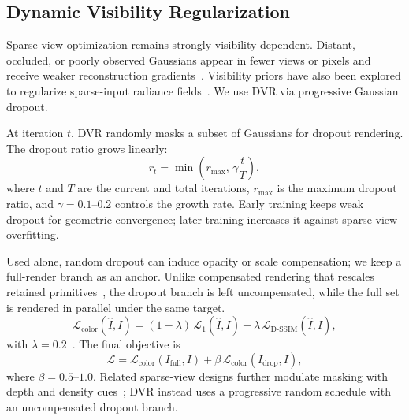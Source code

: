 \subsection{Dynamic Visibility Regularization}
\label{sec:dvr}

Sparse-view optimization remains strongly visibility-dependent. Distant, occluded, or poorly observed Gaussians appear in fewer views or pixels and receive weaker reconstruction gradients~\cite{Xu25_DropoutGS,Park25_DropGaussian}. Visibility priors have also been explored to regularize sparse-input radiance fields~\cite{Somraj23_ViPNeRF}. We use DVR via progressive Gaussian dropout.

At iteration $t$, DVR randomly masks a subset of Gaussians for dropout rendering. The dropout ratio grows linearly:
\begin{equation}
\label{eq:dropout_ratio}
r_t=\min\left(r_{\max},\,\gamma\frac{t}{T}\right),
\end{equation}
where $t$ and $T$ are the current and total iterations, $r_{\max}$ is the maximum dropout ratio, and $\gamma=0.1$--$0.2$ controls the growth rate. Early training keeps weak dropout for geometric convergence; later training increases it against sparse-view overfitting.

Used alone, random dropout can induce opacity or scale compensation; we keep a full-render branch as an anchor. Unlike compensated rendering that rescales retained primitives~\cite{Park25_DropGaussian}, the dropout branch is left uncompensated, while the full set is rendered in parallel under the same target. 
\begin{equation}
\label{eq:color_loss}
\mathcal{L}_{\mathrm{color}}(\hat{I},I)
=
(1-\lambda)\,\mathcal{L}_{1}(\hat{I},I)
+
\lambda\,\mathcal{L}_{\mathrm{D\text{-}SSIM}}(\hat{I},I),
\end{equation}
with $\lambda=0.2$~\cite{Kerbl23_3DGS}. The final objective is
\begin{equation}
\label{eq:dvr_loss}
\mathcal{L}
=
\mathcal{L}_{\mathrm{color}}(I_{\mathrm{full}},I)
+
\beta\,\mathcal{L}_{\mathrm{color}}(I_{\mathrm{drop}},I),
\end{equation}
where $\beta=0.5$--$1.0$. Related sparse-view designs further modulate masking with depth and density cues~\cite{Song26_D2GS}; DVR instead uses a progressive random schedule with an uncompensated dropout branch.
